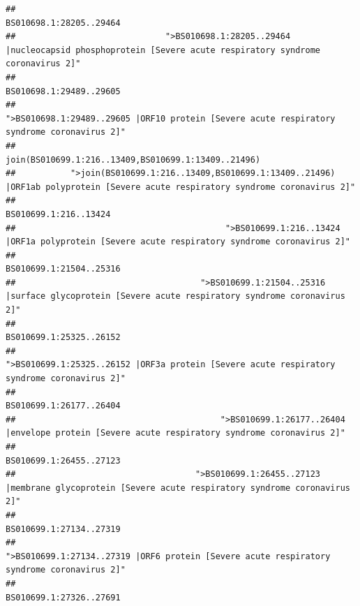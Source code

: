 \documentclass[
]{article}
\begin{document}
\begin{verbatim}
##                                                                                                                BS010698.1:28205..29464 
##                              ">BS010698.1:28205..29464 |nucleocapsid phosphoprotein [Severe acute respiratory syndrome coronavirus 2]" 
##                                                                                                                BS010698.1:29489..29605 
##                                            ">BS010698.1:29489..29605 |ORF10 protein [Severe acute respiratory syndrome coronavirus 2]" 
##                                                                                    join(BS010699.1:216..13409,BS010699.1:13409..21496) 
##           ">join(BS010699.1:216..13409,BS010699.1:13409..21496) |ORF1ab polyprotein [Severe acute respiratory syndrome coronavirus 2]" 
##                                                                                                                  BS010699.1:216..13424 
##                                          ">BS010699.1:216..13424 |ORF1a polyprotein [Severe acute respiratory syndrome coronavirus 2]" 
##                                                                                                                BS010699.1:21504..25316 
##                                     ">BS010699.1:21504..25316 |surface glycoprotein [Severe acute respiratory syndrome coronavirus 2]" 
##                                                                                                                BS010699.1:25325..26152 
##                                            ">BS010699.1:25325..26152 |ORF3a protein [Severe acute respiratory syndrome coronavirus 2]" 
##                                                                                                                BS010699.1:26177..26404 
##                                         ">BS010699.1:26177..26404 |envelope protein [Severe acute respiratory syndrome coronavirus 2]" 
##                                                                                                                BS010699.1:26455..27123 
##                                    ">BS010699.1:26455..27123 |membrane glycoprotein [Severe acute respiratory syndrome coronavirus 2]" 
##                                                                                                                BS010699.1:27134..27319 
##                                             ">BS010699.1:27134..27319 |ORF6 protein [Severe acute respiratory syndrome coronavirus 2]" 
##                                                                                                                BS010699.1:27326..27691 

\end{verbatim}
\end{document}
